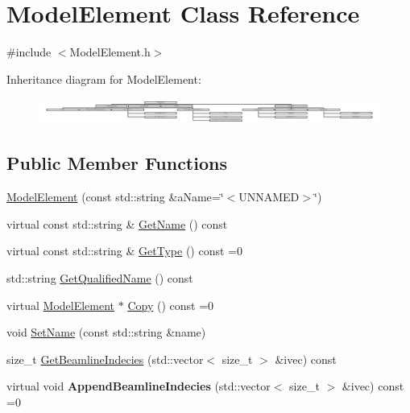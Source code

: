 \hypertarget{classModelElement}{}\section{Model\+Element Class Reference}
\label{classModelElement}


{\ttfamily \#include $<$Model\+Element.\+h$>$}

Inheritance diagram for Model\+Element\+:\begin{figure}[H]
\begin{center}
\leavevmode
\includegraphics[height=0.850633cm]{classModelElement}
\end{center}
\end{figure}
\subsection*{Public Member Functions}
\begin{DoxyCompactItemize}
\item 
\hyperlink{classModelElement_ac9c52abd91d0352df179d0719b63e060}{Model\+Element} (const std\+::string \&a\+Name=\char`\"{}$<$U\+N\+N\+A\+M\+ED$>$\char`\"{})
\item 
virtual const std\+::string \& \hyperlink{classModelElement_ae2bb7fbbbde063a49a02ea6fe22d92c4}{Get\+Name} () const
\item 
virtual const std\+::string \& \hyperlink{classModelElement_a04dc2e51e1999fca612eb1838ec6b271}{Get\+Type} () const =0
\item 
std\+::string \hyperlink{classModelElement_a838ca2cdb62831a812704e6a9a9c7401}{Get\+Qualified\+Name} () const
\item 
virtual \hyperlink{classModelElement}{Model\+Element} $\ast$ \hyperlink{classModelElement_ac3ca26d649bd86a0f31a58ae09941429}{Copy} () const =0
\item 
void \hyperlink{classModelElement_a6ee25b15570805484cdde49e66b910de}{Set\+Name} (const std\+::string \&name)
\item 
size\+\_\+t \hyperlink{classModelElement_a97fe4db8a9b82b5778e4286044ccacf8}{Get\+Beamline\+Indecies} (std\+::vector$<$ size\+\_\+t $>$ \&ivec) const
\item 
\mbox{\label{classModelElement_ac397920ee1bc4a9c8a6eff01205f11dd}} 
virtual void {\bfseries Append\+Beamline\+Indecies} (std\+::vector$<$ size\+\_\+t $>$ \&ivec) const =0
\end{DoxyCompactItemize}
